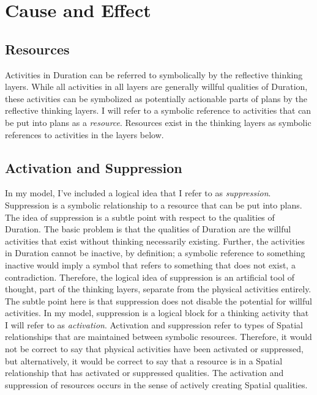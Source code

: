\chapter{Cause and Effect}
\label{chapter:cause_and_effect}

\section{Resources}

Activities in Duration can be referred to symbolically by the
reflective thinking layers.  While all activities in all layers are
generally willful qualities of Duration, these activities can be
symbolized as potentially actionable parts of plans by the reflective
thinking layers.  I will refer to a symbolic reference to activities
that can be put into plans as a \emph{resource}.  Resources exist in
the thinking layers as symbolic references to activities in the layers
below.

\section{Activation and Suppression}

In my model, I've included a logical idea that I refer to as
\emph{suppression}.  Suppression is a symbolic relationship to a
resource that can be put into plans.  The idea of suppression is a
subtle point with respect to the qualities of Duration.  The basic
problem is that the qualities of Duration are the willful activities
that exist without thinking necessarily existing.  Further, the
activities in Duration cannot be inactive, by definition; a symbolic
reference to something inactive would imply a symbol that refers to
something that does not exist, a contradiction.  Therefore, the
logical idea of suppression is an artificial tool of thought, part of
the thinking layers, separate from the physical activities entirely.
The subtle point here is that suppression does not disable the
potential for willful activities.  In my model, suppression is a
logical block for a thinking activity that I will refer to as
\emph{activation}.  Activation and suppression refer to types of
Spatial relationships that are maintained between symbolic resources.
Therefore, it would not be correct to say that physical activities
have been activated or suppressed, but alternatively, it would be
correct to say that a resource is in a Spatial relationship that has
activated or suppressed qualities.  The activation and suppression of
resources occurs in the sense of actively creating Spatial qualities.

